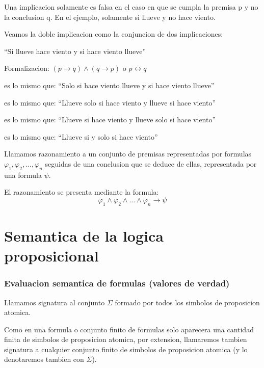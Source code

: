 \begin{remark}
	Una implicacion solamente es falsa en el caso en que se cumpla la premisa p y no la conclusion q. En el ejemplo, solamente si llueve y no hace viento.
\end{remark}

Veamos la doble implicacion como la conjuncion de dos implicaciones:
\begin{example}
	``Si llueve hace viento y si hace viento llueve''

	Formalizacion: \((p \rightarrow q) \wedge (q \rightarrow p )\) o \(p \leftrightarrow q \)

	es lo mismo que: ``Solo si hace viento llueve y si hace viento llueve''

	es lo mismo que: ``Llueve solo si hace viento y llueve si hace viento''

	es lo mismo que: ``Llueve si hace viento y llueve solo si hace viento''

	es lo mismo que: ``Llueve si y solo si hace viento''
\end{example}

\begin{definition}[Razonamiento]
	Llamamos razonamiento a un conjunto de premisas representadas por formulas \(\varphi_1, \varphi_2, \ldots, \varphi_n \) seguidas de una conclusion que se deduce de ellas, representada por una formula \(\psi \).

	El razonamiento se presenta mediante la formula:
	\[
		\varphi_1 \wedge \varphi_2 \wedge \ldots \wedge \varphi_n \rightarrow \psi
	\]
\end{definition}

\part{Semantica de la logica proposicional}

\section{Evaluacion semantica de formulas (valores de verdad)}

\begin{definition}
	Llamamos signatura al conjunto \(\Sigma\) formado por todos los simbolos de proposicion atomica.
\end{definition}

\begin{remark}
	Como en una formula o conjunto finito de formulas solo aparecera una cantidad finita de simbolos de proposicion atomica, por extension, llamaremos tambien signatura a cualquier conjunto finito de simbolos de proposicion atomica (y lo denotaremos tambien con \(\Sigma\)).
\end{remark}

